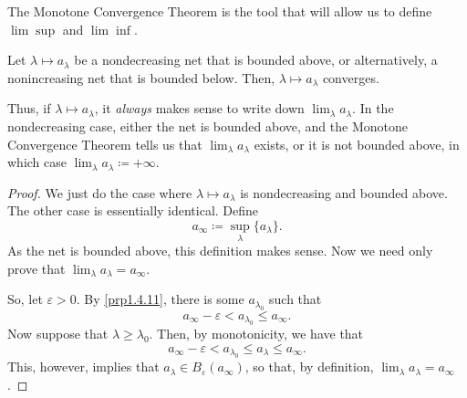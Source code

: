 The Monotone Convergence Theorem is the tool that will allow us to define $\lim \sup$ and $\lim \inf$.
\begin{prp}\label{MonotoneConvergenceTheorem}
Let $\lambda \mapsto a_\lambda$ be a nondecreasing net that is bounded above, or alternatively, a nonincreasing net that is bounded below.  Then, $\lambda \mapsto a_\lambda$ converges.
\begin{rmk}
Thus, if $\lambda \mapsto a_\lambda$, it \emph{always} makes sense to write down $\lim _\lambda a_\lambda$.  In the nondecreasing case, either the net is bounded above, and the Monotone Convergence Theorem tells us that $\lim _\lambda a_\lambda$ exists, or it is not bounded above, in which case $\lim _\lambda a_\lambda \coloneqq +\infty$.
\end{rmk}
\begin{proof}
We just do the case where $\lambda \mapsto a_\lambda$ is nondecreasing and bounded above.  The other case is essentially identical.  Define
\begin{equation}
a_\infty\coloneqq \sup _\lambda \{ a_\lambda \} .
\end{equation}
As the net is bounded above, this definition makes sense.  Now we need only prove that $\lim _\lambda a_\lambda =a_\infty$.

So, let $\varepsilon >0$.  By \cref{prp1.4.11}, there is some $a_{\lambda _0}$ such that
\begin{equation}
a_\infty-\varepsilon <a_{\lambda _0}\leq a_\infty.
\end{equation}
Now suppose that $\lambda \geq \lambda _0$.  Then, by monotonicity, we have that
\begin{equation}
a_\infty-\varepsilon <a_{\lambda _0}\leq a_\lambda \leq a_\infty.
\end{equation}
This, however, implies that $a_\lambda \in B_{\varepsilon}(a_\infty)$, so that, by definition, $\lim _\lambda a_\lambda =a_\infty$.
\end{proof}
\end{prp}
